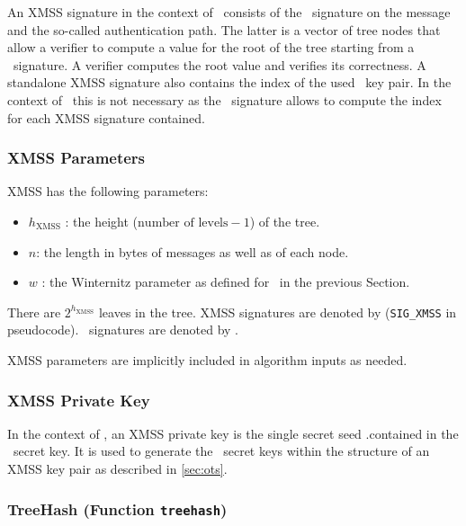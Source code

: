 An XMSS signature in the context of \SPHINCSA\ consists of the \WOTSCS\ signature on the message and the so-called authentication path. The latter is a vector of tree nodes that allow a verifier to compute a value for the root of the tree starting from a \WOTSCS\ signature. A verifier computes the root value and verifies its correctness. A standalone XMSS signature also contains the index of the used \WOTSCS\ key pair. In the context of \SPHINCSA\ this is not necessary as the \SPHINCSA\ signature allows to compute the index for each XMSS signature contained.

\subsubsection{XMSS Parameters}
\label{sec:xmsspara}
XMSS has the following parameters:

\begin{itemize}
    \item $h_{\mathrm{XMSS}}$ : the height ($\text{number of levels} - 1$) of the tree.

    \item $n$: the length in bytes of messages as well as of each node.

    \item $w$ : the Winternitz parameter as defined for \WOTSCS\ in the previous Section.
\end{itemize}

There are $2^{h_{\mathrm{XMSS}}}$ leaves in the tree. XMSS signatures are denoted by \sigxmss  (\texttt{SIG\_XMSS} in pseudocode). \WOTSCS\ signatures are denoted by \sig.

XMSS parameters are implicitly included in algorithm inputs as needed.

\subsubsection{XMSS Private Key}

In the context of \SPHINCSA, an XMSS private key is the single secret seed \sk.\seed contained in the \SPHINCSA\ secret key. It is used to generate the \WOTSCS\ secret keys within the structure of an XMSS key pair as described in \cref{sec:ots}.

\subsubsection{TreeHash (Function \texttt{treehash})}

